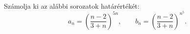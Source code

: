 \documentclass[11pt]{scrartcl}
\begin{document}
Számolja ki az alábbi sorozatok határértékét:
\[
	a_n = \left(\frac{n - 2}{3 + n}\right)^{5n}, \qquad
	b_n = \left(\frac{n - 2}{3 + n}\right)^{n^5}.
\]
\end{document}
